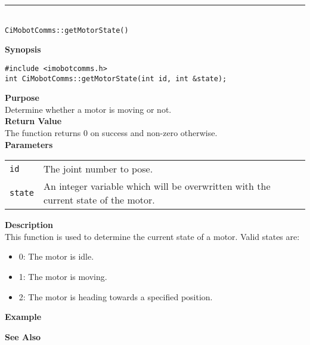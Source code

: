 \noindent
\vspace{5pt}
\rule{4.5in}{0.015in}\\
\noindent
{\LARGE \texttt{CiMobotComms::getMotorState()}}\\
{}

\noindent
{\bf Synopsis}\\
\begin{verbatim}
#include <imobotcomms.h>
int CiMobotComms::getMotorState(int id, int &state);
\end{verbatim}

\noindent
{\bf Purpose}\\
Determine whether a motor is moving or not.\\

\noindent
{\bf Return Value}\\
The function returns 0 on success and non-zero otherwise.\\

\noindent
{\bf Parameters}
\vspace{-0.1in}
\begin{description}
\item               
\begin{tabular}{p{10 mm}p{145 mm}}
\texttt{id} & The joint number to pose. \\
\texttt{state} & An integer variable which will be overwritten with the current state of the motor. 
\end{tabular}
\end{description}

\noindent
{\bf Description}\\
This function is used to determine the current state of a motor. Valid states are:
\begin{itemize}
\item 0: The motor is idle.
\item 1: The motor is moving.
\item 2: The motor is heading towards a specified position.
\end{itemize}

\noindent
{\bf Example}\\
\noindent

\noindent
{\bf See Also}\\

